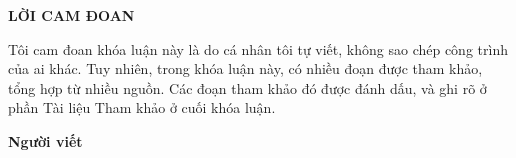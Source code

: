 \documentclass[../../../thesis]{subfiles}
\begin{document}
\begin{center}
    \textbf{\large
        LỜI CAM ĐOAN
    }
\end{center}

Tôi cam đoan khóa luận này là do cá nhân tôi tự viết, không sao chép công trình
của ai khác. Tuy nhiên, trong khóa luận này, có nhiều đoạn được tham khảo, tổng
hợp từ nhiều nguồn. Các đoạn tham khảo đó được đánh dấu, và ghi rõ ở phần Tài
liệu Tham khảo ở cuối khóa luận.

\begin{changemargin}{12cm}{1cm}
    \textbf{Người viết}
\end{changemargin}

\thispagestyle{empty}

\clearpage
\end{document}

